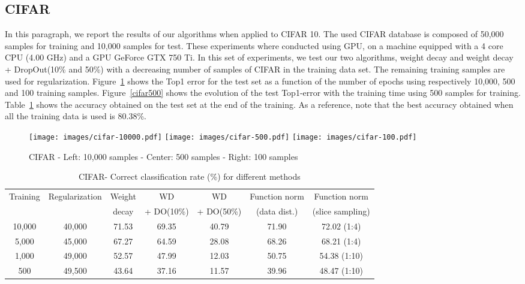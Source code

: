 \documentclass{article}
\begin{document}
\subsection{CIFAR}
In this paragraph, we report the results of our algorithms when applied to CIFAR 10. The used CIFAR database is composed of 50,000 samples for training and 10,000 samples for test. These experiments where conducted using GPU, on a machine equipped with a 4 core CPU (4.00 GHz) and a GPU GeForce GTX 750 Ti. In this set of experiments, we test our two algorithms, weight decay and weight decay + DropOut(10\% and 50\%) with a decreasing number of samples of CIFAR in the training data set. The remaining training samples are used for regularization. Figure~\ref{reg-im-CIFAR} shows the Top1 error for the test set as a function of the number of epochs using respectively 10,000, 500 and 100 training samples. Figure~\ref{cifar500} shows the evolution of the test Top1-error with the training time using 500 samples for training. Table~\ref{cifar-correct} shows the accuracy obtained on the test set at the end of the training. As a reference, note that the best accuracy obtained when all the training data is used is 80.38\%.


\begin{figure}[ht!]
\texttt{[image: images/cifar-10000.pdf]} \hfill 
\texttt{[image: images/cifar-500.pdf]} \hfill
\texttt{[image: images/cifar-100.pdf]}
\caption{CIFAR - Left: 10,000 samples - Center: 500 samples - Right: 100 samples}
\label{reg-im-CIFAR}
\end{figure}
\begin{table}[ht!]
\centering
\begin{tabular}{|c|c||c|c|c|c|c|}
\hline
Training & Regularization & Weight & WD &WD & Function norm  & Function norm\\
& & decay &  + DO(10\%)& + DO(50\%)  &(data dist.)&(slice sampling)\\
\hline
\hline
10,000 & 40,000 & 71.53 & 69.35 & 40.79 & 71.90&  72.02 (1:4)\\
5,000 & 45,000 & 67.27 & 64.59 & 28.08 & 68.26 & 68.21 (1:4)\\
1,000 & 49,000 & 52.57 & 47.99& 12.03 & 50.75 & 54.38 (1:10)\\
500 & 49,500 & 43.64 & 37.16 & 11.57 & 39.96 & 48.47 (1:10)\\
\hline
\end{tabular}
\caption{CIFAR- Correct classification rate (\%) for different methods}
\label{cifar-correct}
\end{table}
\end{document}
